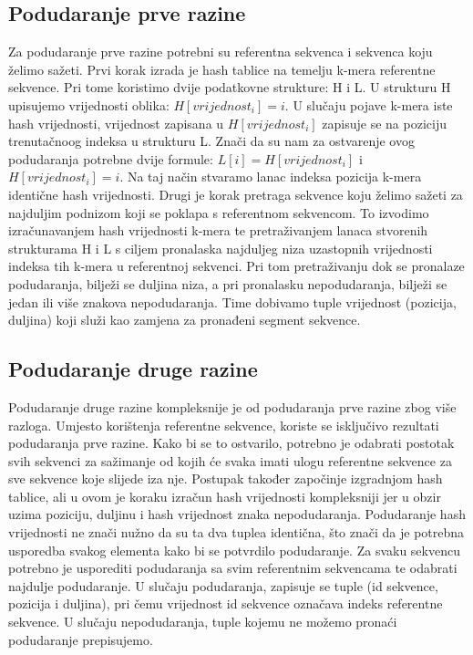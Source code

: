 \subsection{Podudaranje prve razine}
Za podudaranje prve razine potrebni su referentna sekvenca i sekvenca koju želimo sažeti. 
Prvi korak izrada je hash tablice na temelju k-mera referentne sekvence. Pri tome koristimo dvije podatkovne strukture: H i L. U strukturu H upisujemo vrijednosti oblika: $H[vrijednost_{i}] = i$. U slučaju pojave k-mera iste hash vrijednosti, vrijednost zapisana u $H[vrijednost_{i}]$ zapisuje se na poziciju trenutačnoog indeksa u strukturu L. Znači da su nam za ostvarenje ovog podudaranja potrebne dvije formule: $L[i] = H[vrijednost_{i}]$ i $H[vrijednost_{i}] = i$. Na taj način stvaramo lanac indeksa pozicija k-mera identične hash vrijednosti.
Drugi je korak pretraga sekvence koju želimo sažeti za najduljim podnizom koji se poklapa s referentnom sekvencom. To izvodimo izračunavanjem hash vrijednosti k-mera te pretraživanjem lanaca stvorenih strukturama H i L s ciljem pronalaska najduljeg niza uzastopnih vrijednosti indeksa tih k-mera u referentnoj sekvenci. Pri tom pretraživanju dok se pronalaze podudaranja, bilježi se duljina niza, a pri pronalasku nepodudaranja, bilježi se jedan ili više znakova nepodudaranja. Time dobivamo tuple vrijednost (pozicija, duljina) koji služi kao zamjena za pronađeni segment sekvence. 

\subsection{Podudaranje druge razine}
Podudaranje druge razine kompleksnije je od podudaranja prve razine zbog više razloga. Umjesto korištenja referentne sekvence, koriste se isključivo rezultati podudaranja prve razine. Kako bi se to ostvarilo, potrebno je odabrati postotak svih sekvenci za sažimanje od kojih će svaka imati ulogu referentne sekvence za sve sekvence koje slijede iza nje.
Postupak također započinje izgradnjom hash tablice, ali u ovom je koraku izračun hash vrijednosti kompleksniji jer u obzir uzima poziciju, duljinu i hash vrijednost znaka nepodudaranja. Podudaranje hash vrijednosti ne znači nužno da su ta dva tuplea identična, što znači da je potrebna usporedba svakog elementa kako bi se potvrdilo podudaranje. Za svaku sekvencu potrebno je usporediti podudaranja sa svim referentnim sekvencama te odabrati najdulje podudaranje. U slučaju podudaranja, zapisuje se tuple (id sekvence, pozicija i duljina), pri čemu vrijednost id sekvence označava indeks referentne sekvence. U slučaju nepodudaranja, tuple kojemu ne možemo pronaći podudaranje prepisujemo.

